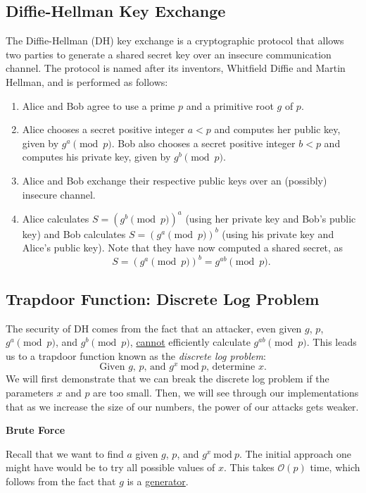 \documentclass{article}
\begin{document}
\subsection*{Diffie-Hellman Key Exchange}
    The Diffie-Hellman (DH) key exchange is a cryptographic protocol that allows two parties to generate a shared secret key over an insecure communication channel. The protocol is named after its inventors, Whitfield Diffie and Martin Hellman, and is performed as follows:
    \begin{enumerate}[label = \arabic*.]
        \item Alice and Bob agree to use a prime $p$ and a primitive root $g$ of $p$.
        \item Alice chooses a secret positive integer $a < p$ and computes her public key, given by $g^{a} \pmod{p}$. Bob also chooses a secret positive integer $b < p$ and computes his private key, given by $g^{b} \pmod{p}$.
        \item Alice and Bob exchange their respective public keys over an (possibly) insecure channel.
        \item Alice calculates $S = (g^{b} \pmod{p})^{a}$ (using her private key and Bob's public key) and Bob calculates $S = (g^{a} \pmod{p})^{b}$ (using his private key and Alice's public key). Note that they have now computed a shared secret, as $$S = (g^{a} \pmod{p})^{b} = g^{ab} \pmod{p}.$$
    \end{enumerate}

\subsection*{Trapdoor Function: Discrete Log Problem}
    The security of DH comes from the fact that an attacker, even given $g$, $p$, $g^{a} \pmod{p}$, and $g^{b} \pmod{p}$, \underline{cannot} efficiently calculate $g^{ab} \pmod{p}$. This leads us to a trapdoor function known as the \textit{discrete log problem}: $$\text{Given $g$, $p$, and $g^{x}\ \text{mod}\ p$, determine $x$}.$$ We will first demonstrate that we can break the discrete log problem if the parameters $x$ and $p$ are too small. Then, we will see through our implementations that as we increase the size of our numbers, the power of our attacks gets weaker.

    \begin{center}
        \textbf{Brute Force}
    \end{center}

    Recall that we want to find $a$ given $g$, $p$, and $g^{x}\ \text{mod}\ p$. The initial approach one might have would be to try all possible values of $x$. This takes $\mathcal{O}(p)$ time, which follows from the fact that $g$ is a \href{https://en.wikipedia.org/wiki/Primitive_root_modulo_n}{generator}.
    
\end{document}
